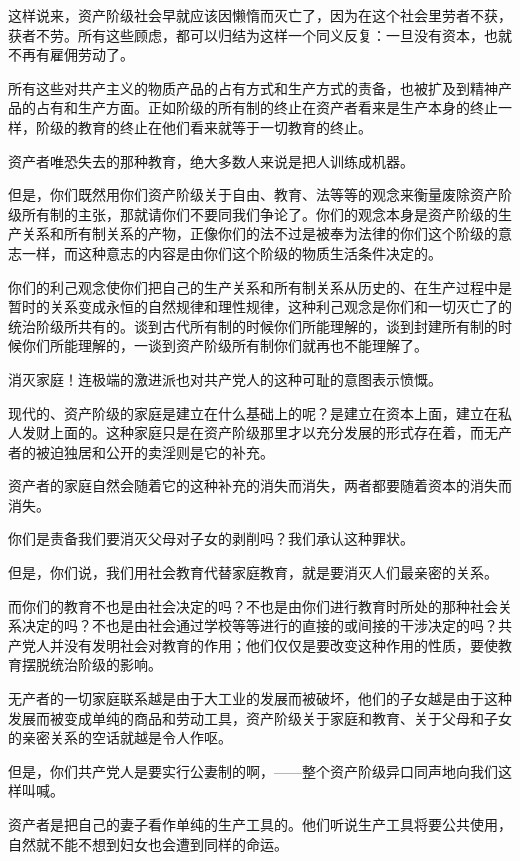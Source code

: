     这样说来，资产阶级社会早就应该因懒惰而灭亡了，因为在这个社会里劳者不获，获者不劳。所有这些顾虑，都可以归结为这样一个同义反复：一旦没有资本，也就不再有雇佣劳动了。

    所有这些对共产主义的物质产品的占有方式和生产方式的责备，也被扩及到精神产品的占有和生产方面。正如阶级的所有制的终止在资产者看来是生产本身的终止一样，阶级的教育的终止在他们看来就等于一切教育的终止。

    资产者唯恐失去的那种教育，绝大多数人来说是把人训练成机器。

    但是，你们既然用你们资产阶级关于自由、教育、法等等的观念来衡量废除资产阶级所有制的主张，那就请你们不要同我们争论了。你们的观念本身是资产阶级的生产关系和所有制关系的产物，正像你们的法不过是被奉为法律的你们这个阶级的意志一样，而这种意志的内容是由你们这个阶级的物质生活条件决定的。

    你们的利己观念使你们把自己的生产关系和所有制关系从历史的、在生产过程中是暂时的关系变成永恒的自然规律和理性规律，这种利己观念是你们和一切灭亡了的统治阶级所共有的。谈到古代所有制的时候你们所能理解的，谈到封建所有制的时候你们所能理解的，一谈到资产阶级所有制你们就再也不能理解了。

    消灭家庭！连极端的激进派也对共产党人的这种可耻的意图表示愤慨。

    现代的、资产阶级的家庭是建立在什么基础上的呢？是建立在资本上面，建立在私人发财上面的。这种家庭只是在资产阶级那里才以充分发展的形式存在着，而无产者的被迫独居和公开的卖淫则是它的补充。

    资产者的家庭自然会随着它的这种补充的消失而消失，两者都要随着资本的消失而消失。

    你们是责备我们要消灭父母对子女的剥削吗？我们承认这种罪状。

    但是，你们说，我们用社会教育代替家庭教育，就是要消灭人们最亲密的关系。

    而你们的教育不也是由社会决定的吗？不也是由你们进行教育时所处的那种社会关系决定的吗？不也是由社会通过学校等等进行的直接的或间接的干涉决定的吗？共产党人并没有发明社会对教育的作用；他们仅仅是要改变这种作用的性质，要使教育摆脱统治阶级的影响。

    无产者的一切家庭联系越是由于大工业的发展而被破坏，他们的子女越是由于这种发展而被变成单纯的商品和劳动工具，资产阶级关于家庭和教育、关于父母和子女的亲密关系的空话就越是令人作呕。

    但是，你们共产党人是要实行公妻制的啊，——整个资产阶级异口同声地向我们这样叫喊。

    资产者是把自己的妻子看作单纯的生产工具的。他们听说生产工具将要公共使用，自然就不能不想到妇女也会遭到同样的命运。

